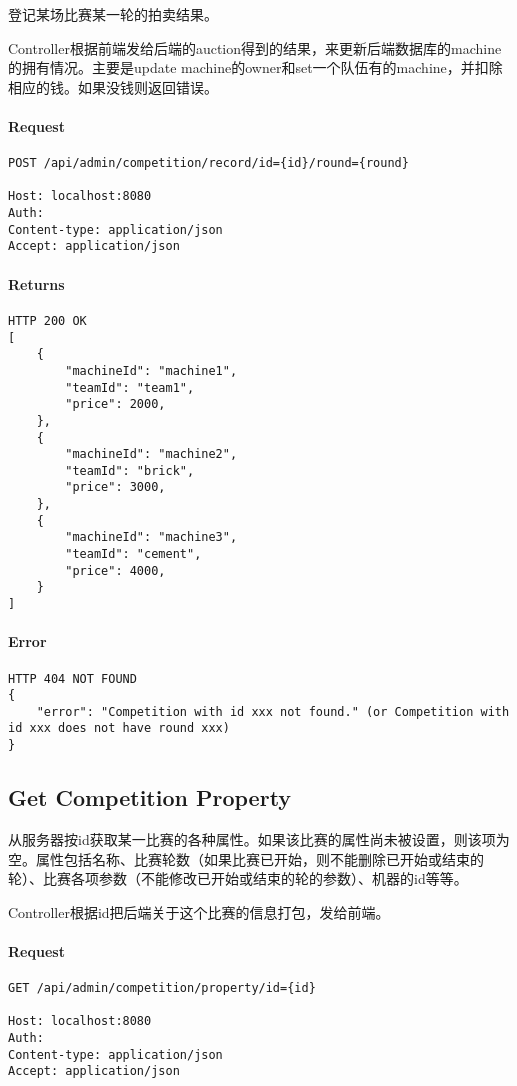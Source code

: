 \documentclass{article}
\begin{document}
登记某场比赛某一轮的拍卖结果。

Controller根据前端发给后端的auction得到的结果，来更新后端数据库的machine的拥有情况。主要是update machine的owner和set一个队伍有的machine，并扣除相应的钱。如果没钱则返回错误。

\paragraph*{Request}
\begin{lstlisting}
POST /api/admin/competition/record/id={id}/round={round}

Host: localhost:8080
Auth:
Content-type: application/json
Accept: application/json
\end{lstlisting}

\paragraph*{Returns}
\begin{lstlisting}
HTTP 200 OK
[
    {
        "machineId": "machine1",
        "teamId": "team1",
        "price": 2000,
    },
    {
        "machineId": "machine2",
        "teamId": "brick",
        "price": 3000,
    },
    {
        "machineId": "machine3",
        "teamId": "cement",
        "price": 4000,
    }
]
\end{lstlisting}

\paragraph*{Error}
\begin{lstlisting}
HTTP 404 NOT FOUND
{
    "error": "Competition with id xxx not found." (or Competition with id xxx does not have round xxx)
}
\end{lstlisting}


\subsection{Get Competition Property}

从服务器按id获取某一比赛的各种属性。如果该比赛的属性尚未被设置，则该项为空。属性包括名称、比赛轮数（如果比赛已开始，则不能删除已开始或结束的轮）、比赛各项参数（不能修改已开始或结束的轮的参数）、机器的id等等。

Controller根据id把后端关于这个比赛的信息打包，发给前端。

\paragraph*{Request}
\begin{lstlisting}
GET /api/admin/competition/property/id={id}

Host: localhost:8080
Auth:
Content-type: application/json
Accept: application/json
\end{lstlisting}
\end{document}
